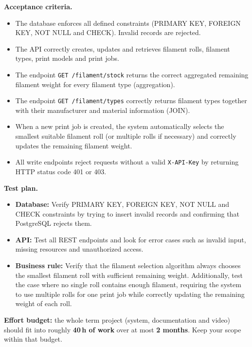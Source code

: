 \documentclass[11pt,a4paper]{article}
\begin{document}
\textbf{Acceptance criteria.}
\begin{itemize}[topsep=2pt]
    \item The database enforces all defined constraints (PRIMARY KEY, FOREIGN
    KEY, NOT NULL and CHECK). Invalid records are rejected.
    
    \item The API correctly creates, updates and retrieves filament rolls,
    filament types, print models and print jobs.

    \item The endpoint \texttt{GET /filament/stock} returns the correct
    aggregated remaining filament weight for every filament type (aggregation).

    \item The endpoint \texttt{GET /filament/types} correctly returns filament
    types together with their manufacturer and material information (JOIN).

    \item When a new print job is created, the system automatically selects the
    smallest suitable filament roll (or multiple rolls if necessary) and
    correctly updates the remaining filament weight.

    \item All write endpoints reject requests without a valid
    \texttt{X-API-Key} by returning HTTP status code 401 or 403.
\end{itemize}

\textbf{Test plan.}
\begin{itemize}[topsep=2pt]

    \item \textbf{Database:}
    Verify PRIMARY KEY, FOREIGN KEY, NOT NULL and CHECK constraints by trying
    to insert invalid records and confirming that PostgreSQL rejects them.

    \item \textbf{API:}
    Test all REST endpoints and look for error
    cases such as invalid input, missing resources and unauthorized access.

    \item \textbf{Business rule:}
    Verify that the filament selection algorithm always chooses the smallest
    filament roll with sufficient remaining weight. Additionally, test the case
    where no single roll contains enough filament, requiring the system to use
    multiple rolls for one print job while correctly updating the remaining
    weight of each roll.

\end{itemize}



\vspace{1em}
\begin{infobox}
\textbf{Effort budget:} the whole term project (system, documentation and video)
should fit into roughly \textbf{40\,h of work} over at most \textbf{2 months}.
Keep your scope within that budget.
\end{infobox}
\end{document}
